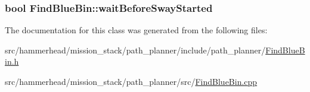 \subsubsection[{\texorpdfstring{wait\+Before\+Sway\+Started}{waitBeforeSwayStarted}}]{\setlength{\rightskip}{0pt plus 5cm}bool Find\+Blue\+Bin\+::wait\+Before\+Sway\+Started}\hypertarget{classFindBlueBin_a234b002d35a26565afe53744fed13eb6}{}\label{classFindBlueBin_a234b002d35a26565afe53744fed13eb6}


The documentation for this class was generated from the following files\+:\begin{DoxyCompactItemize}
\item 
src/hammerhead/mission\+\_\+stack/path\+\_\+planner/include/path\+\_\+planner/\hyperlink{FindBlueBin_8h}{Find\+Blue\+Bin.\+h}\item 
src/hammerhead/mission\+\_\+stack/path\+\_\+planner/src/\hyperlink{FindBlueBin_8cpp}{Find\+Blue\+Bin.\+cpp}\end{DoxyCompactItemize}
